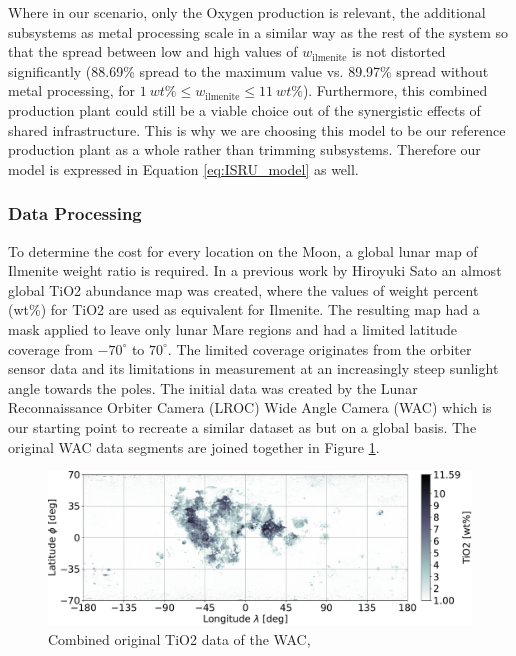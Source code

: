 \documentclass[utf8]{FrontiersinHarvard} %
\begin{document}
 Where in our scenario, only the Oxygen production is relevant, the additional subsystems as metal processing scale in a similar way as the rest of the system so that the spread between low and high values of $w_{\mathrm{ilmenite}}$ is not distorted significantly (88.69\%  spread to the maximum value vs. 89.97\% spread without metal processing, for $1 \ wt\% \leq w_{\mathrm{ilmenite}} \leq 11 \ wt\%$). Furthermore, this combined production plant could still be a viable choice out of the synergistic effects of shared infrastructure. This is why we are choosing this model to be our reference production plant as a whole rather than trimming subsystems. Therefore our model is expressed in Equation \ref{eq:ISRU_model} as well.

\subsubsection{Data Processing}
To determine the cost for every location on the Moon, a global lunar map of Ilmenite weight ratio is required. In a previous work by Hiroyuki Sato \citep{Sato.2017} an almost global TiO2 abundance map was created, where the values of weight percent (wt\%) for TiO2 are used as equivalent for Ilmenite. The resulting map had a mask applied to leave only lunar Mare regions and had a limited latitude coverage from $-70^{\circ}$ to $70^{\circ}$. The limited coverage originates from the orbiter sensor data and its limitations in measurement at an increasingly steep sunlight angle towards the poles. The initial data was created by the Lunar Reconnaissance Orbiter Camera (LROC) Wide Angle Camera (WAC) which is our starting point to recreate a similar dataset as \citep{Sato.2017} but on a global basis.
The original WAC data segments are joined together in Figure \ref{fig:TiO2-original}.

\begin{figure}[h!]
\begin{center}
\includegraphics[width=\linewidth]{img/WAC_TIO2_COMBINED.pdf}
\end{center}
\caption{Combined original TiO2 data of the WAC, \citep{Sato.2017}}
\label{fig:TiO2-original}
\end{figure}
\end{document}
